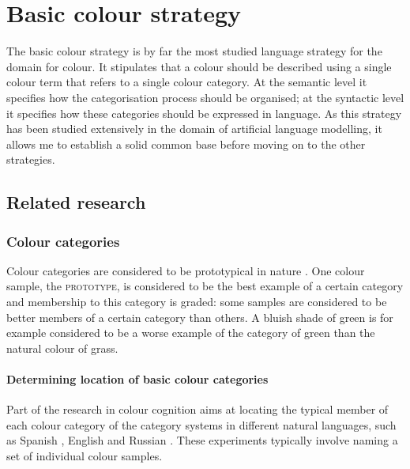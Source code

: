 \chapter{Basic colour strategy}
\label{s:basic-strategy}
\label{s:first-strategy}

The basic colour strategy is by far the most studied language
strategy for the domain for colour. It stipulates that a colour should
be described using a single colour term that refers to a single colour
category. At the semantic level it specifies how the categorisation
process should be organised; at the syntactic level it specifies how
these categories should be expressed in language. As this strategy has
been studied extensively in the domain of artificial language
modelling, it allows me to establish a solid common base before moving
on to the other strategies.

\section{Related research}

\subsection{Colour categories}

Colour categories are considered to be
prototypical in nature \citep{rosch73natural}. One colour sample, the
\textsc{prototype}, is considered
to be the best example of a certain category and membership to this
category is graded: some samples are considered to be better members
of a certain category than others. A bluish shade of green is for
example considered to be a worse example of the category of green than
the natural colour of grass.

\subsubsection{Determining location of basic colour categories}

Part of the research in colour cognition aims at locating the typical
member of each colour category of the category systems in different
natural languages, such as Spanish \citep{lillo07locating}, English
\citep{boynton87locating, sturges95location} and Russian
\citep{safuanova07russian}. These experiments typically involve naming
a set of individual colour samples.

